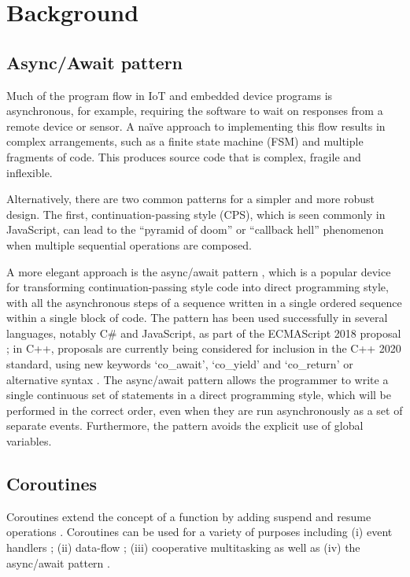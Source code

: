 \documentclass[format=acmsmall, review=false, screen=false]{acmart}
\begin{document}
\section{Background}
\label{section:background}

\subsection{Async/Await pattern}

Much of the program flow in IoT and embedded device programs is asynchronous, for example, requiring the software to wait on responses from a remote device or sensor. A naïve approach to implementing this flow results in complex arrangements, such as a finite state machine (FSM) and multiple fragments of code. This produces source code that is complex, fragile and inflexible.

Alternatively, there are two common patterns for a simpler and more robust design. The first, continuation-passing style (CPS), which is seen commonly in JavaScript, can lead to the “pyramid of doom” or “callback hell” phenomenon \cite{Brodu2015, Edwards2009, Madsen2017, Kambona2013} when multiple sequential operations are composed.

A more elegant approach is the async/await pattern \cite{Bierman2012, Haller2016, Okur2014, Syme2011}, which is a popular device for transforming continuation-passing style code into direct programming style, with all the asynchronous steps of a sequence written in a single ordered sequence within a single block of code. The pattern has been used successfully in several languages, notably C\# \cite{Bierman2012, Okur2014} and JavaScript, as part of the ECMAScript 2018 proposal \cite{ECMA2017}; in C++, proposals are currently being considered for inclusion in the C++ 2020 standard, using new keywords ‘co\_await’, ‘co\_yield’ and ‘co\_return’ or alternative syntax \cite{ISO2017, Romer2018}. The async/await pattern allows the programmer to write a single continuous set of statements in a direct programming style, which will be performed in the correct order, even when they are run asynchronously as a set of separate events. Furthermore, the pattern avoids the explicit use of global variables.

\subsection{Coroutines}

Coroutines extend the concept of a function by adding suspend and resume operations \cite{Conway1963, Knuth1968, Marlin1979}. Coroutines can be used for a variety of purposes including (i) event handlers \cite{Dunkels2006}; (ii) data-flow \cite{Kugler2013}; (iii) cooperative multitasking \cite{Susilo2009} as well as (iv) the async/await pattern \cite{ISO2017}.
\end{document}
